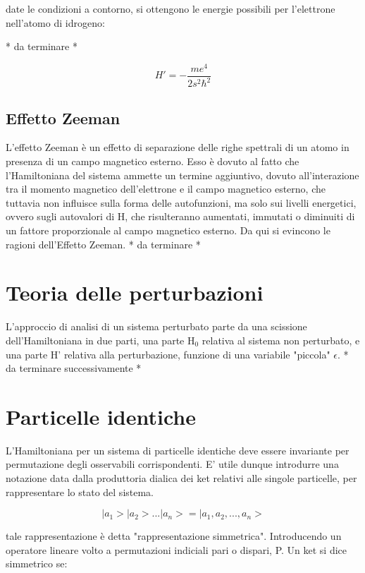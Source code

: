\documentclass{article}
\begin{document}
date le condizioni a contorno, si ottengono le energie possibili per l'elettrone nell'atomo di idrogeno:

* da terminare *

\begin{equation}
    H'=-\frac{me^4}{2s^2\hbar^2}
\end{equation}

\subsection{Effetto Zeeman}
L'effetto Zeeman è un effetto di separazione delle righe spettrali di un atomo in presenza di un campo magnetico esterno.
Esso è dovuto al fatto che l'Hamiltoniana del sistema ammette un termine aggiuntivo, dovuto all'interazione tra il momento magnetico dell'elettrone e il campo magnetico esterno,
che tuttavia non influisce sulla forma delle autofunzioni, ma solo sui livelli energetici, ovvero sugli autovalori di H,
che risulteranno aumentati, immutati o diminuiti di un fattore proporzionale al campo magnetico esterno.
Da qui si evincono le ragioni dell'Effetto Zeeman.
* da terminare *


\section{Teoria delle perturbazioni}
L'approccio di analisi di un sistema perturbato parte da una scissione dell'Hamiltoniana in due parti, una parte H$_0$ relativa al sistema non perturbato, e una parte H' relativa alla perturbazione, funzione di una variabile "piccola" $\epsilon$.
* da terminare successivamente *

\section{Particelle identiche}
L'Hamiltoniana per un sistema di particelle identiche deve essere invariante per permutazione degli osservabili corrispondenti.
E' utile dunque introdurre una notazione data dalla produttoria dialica dei ket relativi alle singole particelle, per rappresentare lo stato del sistema.

\begin{equation}
    |a_1>|a_2>...|a_n>=|a_1,a_2,...,a_n>
\end{equation}

tale rappresentazione è detta "rappresentazione simmetrica".
Introducendo un operatore lineare volto a permutazioni indiciali pari o dispari, P.
Un ket si dice simmetrico se:
\end{document}
